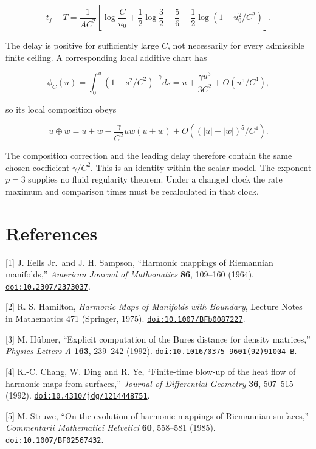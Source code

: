 \documentclass[
  11pt,
  a4paper,
]{article}
\begin{document}
\[
t_f-T=\frac1{AC^2}\left[
\log\frac C{u_0}+\frac12\log\frac32-\frac56
+\frac12\log(1-u_0^2/C^2)\right].
\]

The delay is positive for sufficiently large \(C\), not necessarily for every admissible finite ceiling. A corresponding local additive chart has

\[
\phi_C(u)=\int_0^u(1-s^2/C^2)^{-\gamma}ds
=u+\frac{\gamma u^3}{3C^2}+O(u^5/C^4),
\]

so its local composition obeys

\[
u\oplus w=u+w-\frac{\gamma}{C^2}uw(u+w)
+O((|u|+|w|)^5/C^4).
\]

The composition correction and the leading delay therefore contain the same chosen coefficient \(\gamma/C^2\). This is an identity within the scalar model. The exponent \(p=3\) supplies no fluid regularity theorem. Under a changed clock the rate maximum and comparison times must be recalculated in that clock.

\section{References}\label{references}

{[}1{]} J. Eells Jr.~and J. H. Sampson, ``Harmonic mappings of Riemannian manifolds,'' \emph{American Journal of Mathematics} \textbf{86}, 109--160 (1964). \href{https://doi.org/10.2307/2373037}{\nolinkurl{doi:10.2307/2373037}}.

{[}2{]} R. S. Hamilton, \emph{Harmonic Maps of Manifolds with Boundary}, Lecture Notes in Mathematics 471 (Springer, 1975). \href{https://doi.org/10.1007/BFb0087227}{\nolinkurl{doi:10.1007/BFb0087227}}.

{[}3{]} M. Hübner, ``Explicit computation of the Bures distance for density matrices,'' \emph{Physics Letters A} \textbf{163}, 239--242 (1992). \href{https://doi.org/10.1016/0375-9601(92)91004-B}{\nolinkurl{doi:10.1016/0375-9601(92)91004-B}}.

{[}4{]} K.-C. Chang, W. Ding and R. Ye, ``Finite-time blow-up of the heat flow of harmonic maps from surfaces,'' \emph{Journal of Differential Geometry} \textbf{36}, 507--515 (1992). \href{https://doi.org/10.4310/jdg/1214448751}{\nolinkurl{doi:10.4310/jdg/1214448751}}.

{[}5{]} M. Struwe, ``On the evolution of harmonic mappings of Riemannian surfaces,'' \emph{Commentarii Mathematici Helvetici} \textbf{60}, 558--581 (1985). \href{https://doi.org/10.1007/BF02567432}{\nolinkurl{doi:10.1007/BF02567432}}.
\end{document}
